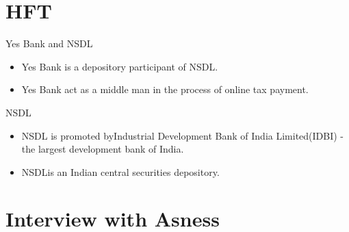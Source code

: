 \documentclass{beamer}
\begin{document}

\section{HFT}

\begin{frame}{Yes Bank and NSDL}

\begin{itemize}
  \item Yes Bank is a depository participant of NSDL.

  \item Yes Bank act as a middle man in the process of online tax payment.

\end{itemize}

\vskip 1cm
\end{frame}

\begin{frame}{NSDL}

\begin{itemize}
  \item NSDL is promoted byIndustrial Development Bank of India Limited(IDBI) - the largest development bank of India.
\item NSDLis an Indian central securities depository.

\end{itemize}
\vskip 1cm

\end{frame}



\section{Interview with Asness}
\end{document}
